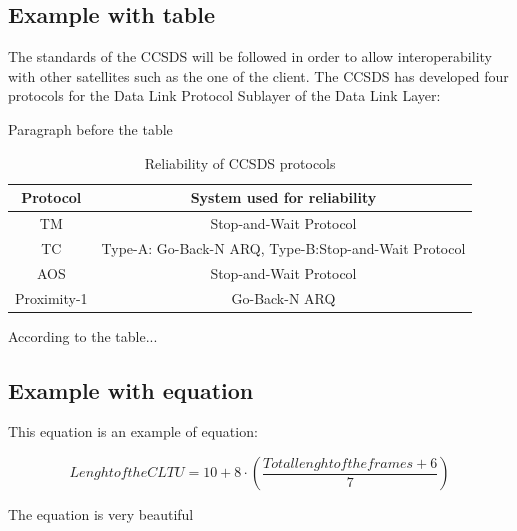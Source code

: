 \subsection{Example with table}
The standards of the CCSDS will be followed in order to allow interoperability with other satellites such as the one of the client. The CCSDS has developed four protocols for the Data Link Protocol Sublayer of the Data Link Layer\cite{Secretariat2014}:

Paragraph before the table
\begin{table}[H]
\begin{center}
\begin{tabular}{|c|c|}
\hline
\textbf{Protocol}&\textbf{System used for reliability}\\
\hline
TM&Stop-and-Wait Protocol\\
\hline
TC&Type-A: Go-Back-N ARQ, Type-B:Stop-and-Wait Protocol\\
\hline
AOS&Stop-and-Wait Protocol\\
\hline
Proximity-1&Go-Back-N ARQ\\
\hline
\end{tabular}
\caption{Reliability of CCSDS protocols}
\end{center}
\end{table}

According to the table... 

\subsection{Example with equation}
This equation is an example of equation:
 
\begin{equation}
Lenght of the CLTU=10+8\cdot(\frac{Total lenght of the frames+6}{7})
\end{equation} 

The equation is very beautiful
%
%
